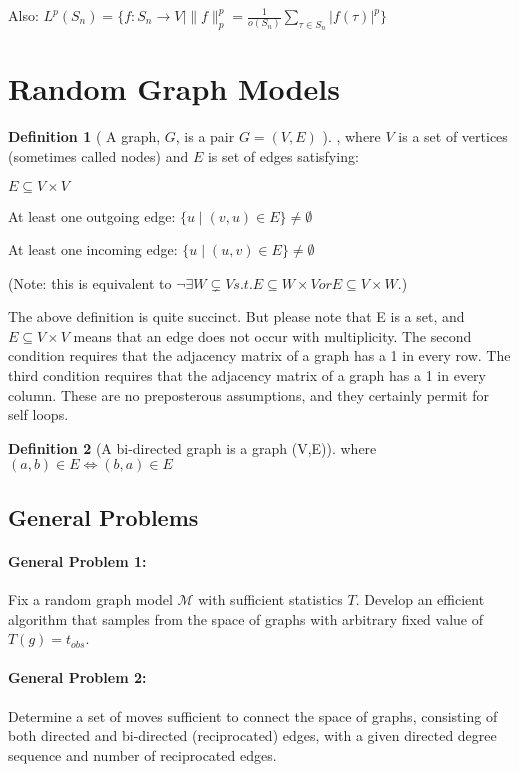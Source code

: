 \documentclass{article}
\theoremstyle{definition}
\newtheorem{definition}{Definition}
\begin{document}
Also: \(
L^p(S_n) = \{ f:S_n \rightarrow V \mid \|f\|_p^p = \frac{1}{o(S_n)}\sum_{\tau \in S_n} |f(\tau)|^p \}
\)

\section{Random Graph Models}
\begin{definition}[ A graph, $G$, is a pair $G=(V,E)$ ], where $V$ is a set of vertices (sometimes called nodes) and $E$ is set of edges satisfying:
\item $E \subseteq V \times V $
\item At least one outgoing edge: $ \{ u \mid (v,u) \in E\} \neq \emptyset $
\item At least one incoming edge: $ \{ u \mid (u,v) \in E\} \neq \emptyset $
\end{definition}

(Note: this is equivalent to $ \neg \exists W \subsetneq V s.t. E \subseteq W\times V  or E \subseteq V\times W $.)

\begin{remark} The above definition is quite succinct. But please note that E is a set, and $E \subseteq V \times V$ means that an edge does not occur with multiplicity. The second condition requires that the adjacency matrix of a graph has a 1 in every row. The third condition requires that the adjacency matrix of a graph has a 1 in every column. These are no preposterous assumptions, and they certainly permit for self loops.
\end{remark}

\begin{definition}[A bi-directed graph is a graph (V,E)] where $(a,b) \in E \iff (b,a) \in E$ \end{definition}

\subsection{General Problems}

\paragraph{General Problem 1:} Fix a random graph model $\mathcal{M}$ with sufficient statistics $T$. Develop an efficient algorithm that samples from the space of graphs with arbitrary fixed value of $T(g) = t_{obs}$.

\paragraph{General Problem 2:} Determine a set of moves sufficient to connect the space of graphs, consisting of both directed and bi-directed (reciprocated) edges, with a given directed degree sequence and number of reciprocated edges.
\end{document}
